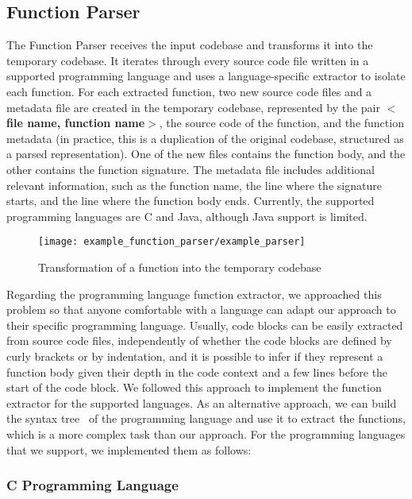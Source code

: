 \subsection{Function Parser}

The Function Parser receives the input codebase and transforms it into the temporary
codebase. It iterates through every source code file written in a supported programming 
language and uses a language-specific extractor to isolate each function. For each extracted 
function, two new source code files and a metadata file are created in the temporary codebase, 
represented by the pair \textbf{$<$file name, function name$>$}, the source code of the function, 
and the function metadata (in practice, this is a duplication of the original codebase, 
structured as a parsed representation). One of the new files contains the function body, and the other 
contains the function signature. The metadata file includes additional relevant information,
such as the function name, the line where the signature starts, and the line where the function 
body ends. Currently, the supported programming languages are C and Java, although Java support is limited.

\begin{figure}
\texttt{[image: example\_function\_parser/example\_parser]}
\caption{Transformation of a function into the temporary codebase}
\label{fig:transform}
\end{figure}

Regarding the programming language function extractor, we approached this problem so that anyone 
comfortable with a language can adapt our approach to their specific programming language. 
Usually, code blocks can be easily extracted from source code files, independently of whether the 
code blocks are defined by curly brackets or by indentation, and it is possible to infer if 
they represent a function body given their depth in the code context and a few lines before the 
start of the code block. We followed this approach to implement the function extractor for the 
supported languages. As an alternative approach, we can build the syntax tree~\citep{compiler} 
of the programming language and use it to extract the functions, which is a more complex task than 
our approach. For the programming languages that we support, we implemented them as follows:

\subsubsection{C Programming Language}

